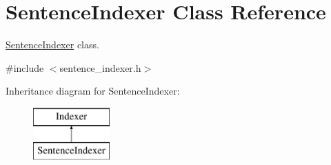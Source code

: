 \hypertarget{class_sentence_indexer}{}\section{Sentence\+Indexer Class Reference}
\label{class_sentence_indexer}


\hyperlink{class_sentence_indexer}{Sentence\+Indexer} class.  




{\ttfamily \#include $<$sentence\+\_\+indexer.\+h$>$}

Inheritance diagram for Sentence\+Indexer\+:\begin{figure}[H]
\begin{center}
\leavevmode
\includegraphics[height=2.000000cm]{class_sentence_indexer}
\end{center}
\end{figure}
